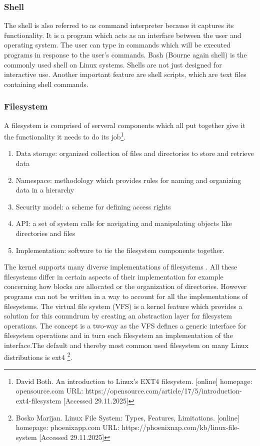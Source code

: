 \subsubsection{Shell}

The shell is also referred to as command interpreter because it captures its functionality. It is a program which acts as an interface between the user and operating system. The user can type in commands which will be executed programs in response to the user's commands. \newline\newline Bash (Bourne again shell) is the commonly used shell on Linux systems. Shells are not just designed for interactive use. Another important feature are shell scripts, which are text files containing shell commands\cite{kerrisk2010}.

\subsubsection{Filesystem}

A filesystem is comprised of serveral components which all put together give it the functionality it needs to do its job\footnote{David Both. An introduction to Linux's EXT4 filesystem. [online] homepage: opensource.com URL: https://opensource.com/article/17/5/introduction-ext4-filesystem [Accessed 29.11.2025]}.

\begin{enumerate}
	\item Data storage: organized collection of files and directories to store and retrieve data
	\item Namespace: methodology which provides rules for naming and organizing data in a hierarchy
	\item Security model: a scheme for defining access rights
	\item API: a set of system calls for navigating and manipulating objects like directories and files
	\item Implementation: software to tie the filesystem components together.
\end{enumerate}

The kernel supports many diverse implementations of filesystems \cite{nemeth2011}. All these filesystems differ in certain aspects of their implementation for example concerning how blocks are allocated or the organization of directories. However programs can not be written in a way to account for all the implementations of filesystems. The virtual file system (VFS) is a kernel feature which provides a solution for this conundrum by creating an abstraction layer for filesystem operations. The concept is a two-way as the VFS defines a generic interface for filesystem operations and in turn each filesystem an implementation of the interface\cite{kerrisk2010}.\newline\newline The default and thereby most common used filesystem on many Linux distributions is ext4 \footnote{Bosko Marijan. Linux File System: Types, Features, Limitations. [online] homepage: phoenixapp.com URL: https://phoenixnap.com/kb/linux-file-system [Accessed 29.11.2025]}.



